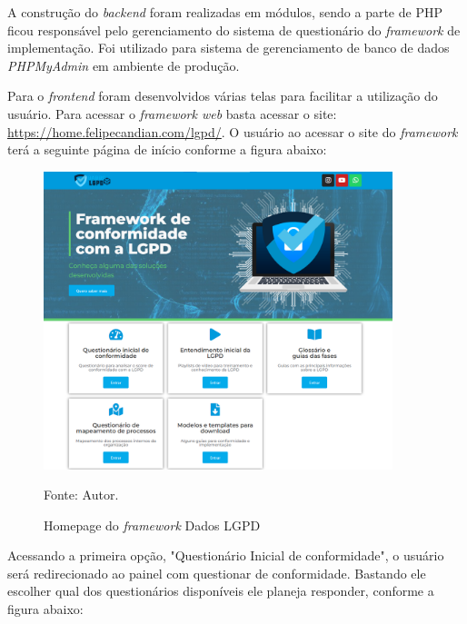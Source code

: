 \documentclass[
	12pt,				%
	openright,			%
	oneside,			%
	a4paper,			%
	english,			%
	french,				%
	spanish,			%
	brazil,				%
	]{abntex2}
\begin{document}
A construção do \textit{backend} foram realizadas em módulos, sendo a parte de PHP ficou responsável pelo gerenciamento do sistema de questionário do \textit{framework} de implementação. Foi utilizado para sistema de gerenciamento de banco de dados \textit{PHPMyAdmin} em ambiente de produção.

Para o \textit{frontend} foram desenvolvidos várias telas para facilitar a utilização do usuário. Para acessar o \textit{framework web} basta acessar o site:  \url{https://home.felipecandian.com/lgpd/}.
O usuário ao acessar o site do \textit{framework} terá a seguinte página de início conforme a figura abaixo:

\begin{figure}[ht]
    \centering
    \caption{Homepage do \textit{framework} Dados LGPD}
    \includegraphics[width=4.0in]{Images/homepag.png}
    \label{fig: homepage}
    
    \centering \small Fonte: Autor.
\end{figure}

Acessando a primeira opção, "Questionário Inicial de conformidade", o usuário será redirecionado ao painel com questionar de conformidade. Bastando ele escolher qual dos questionários disponíveis ele planeja responder, conforme a figura abaixo:
\end{document}
